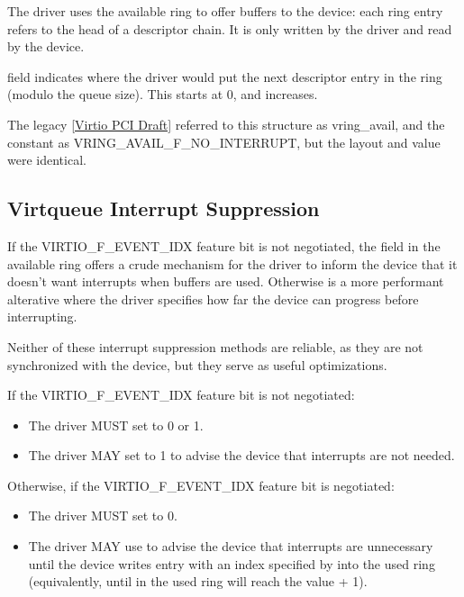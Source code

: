 The driver uses the available ring to offer buffers to the
device: each ring entry refers to the head of a descriptor chain.  It is only
written by the driver and read by the device.

 field indicates where the driver would put the next descriptor
entry in the ring (modulo the queue size). This starts at 0, and increases.

\begin{note}
The legacy \hyperref[intro:Virtio PCI Draft]{[Virtio PCI Draft]}
referred to this structure as vring_avail, and the constant as
VRING_AVAIL_F_NO_INTERRUPT, but the layout and value were identical.
\end{note}

\subsection{Virtqueue Interrupt Suppression}\label{sec:Basic Facilities of a Virtio Device / Virtqueues / Virtqueue Interrupt Suppression}

If the VIRTIO_F_EVENT_IDX feature bit is not negotiated,
the  field in the available ring offers a crude mechanism for the driver to inform
the device that it doesn't want interrupts when buffers are used.  Otherwise
 is a more performant alterative where the driver
specifies how far the device can progress before interrupting.

Neither of these interrupt suppression methods are reliable, as they
are not synchronized with the device, but they serve as
useful optimizations.

If the VIRTIO_F_EVENT_IDX feature bit is not negotiated:
\begin{itemize}
\item The driver MUST set  to 0 or 1.
\item The driver MAY set  to 1 to advise
the device that interrupts are not needed.
\end{itemize}

Otherwise, if the VIRTIO_F_EVENT_IDX feature bit is negotiated:
\begin{itemize}
\item The driver MUST set  to 0.
\item The driver MAY use  to advise the device that interrupts are unnecessary until the device writes entry with an index specified by  into the used ring (equivalently, until  in the
used ring will reach the value  + 1).
\end{itemize}

